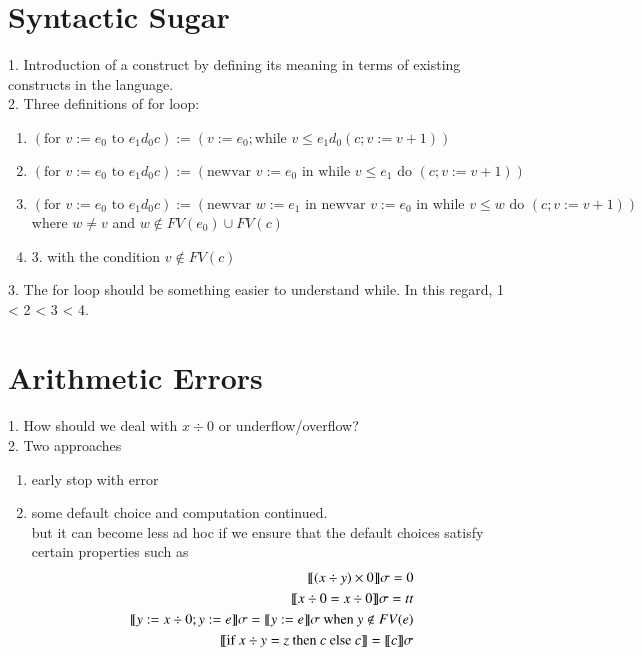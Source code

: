\documentclass{report}[12pt]
\begin{document}
\section{Syntactic Sugar}
1. Introduction of a construct by defining its meaning in terms of existing constructs in the language. \\
2. Three definitions of for loop:
\begin{enumerate}
    \item $(\text{for }v:=e_0 \text{ to }e_1 d_0 c):=(v:=e_0;\text{while }v\le e_1 d_0 (c;v:=v+1))$
    \item $(\text{for }v:=e_0 \text{ to }e_1 d_0 c):=(\text{newvar }v:=e_0\text{ in while }v\le e_1 \text{ do }(c;v:=v+1))$
    \item $(\text{for }v:=e_0 \text{ to }e_1 d_0 c):=(\text{newvar }w:=e_1 \text{ in newvar }v:=e_0 \text{ in while }v\le w\text{ do }(c;v:=v+1))$\\
    where $w\neq v$ and $w \notin FV(e_0)\cup FV(c)$
    \item 3. with the condition $v\notin FV(c)$
\end{enumerate}
3. The for loop should be something easier to understand while. In this regard, 1 < 2 < 3 < 4.
\section{Arithmetic Errors}
1. How should we deal with $x\div 0$ or underflow/overflow? \\
2. Two approaches
\begin{enumerate}
    \item early stop with error
    \item some default choice and computation continued. \\
    but it can become less ad hoc if we ensure that the default choices satisfy certain properties such as
    \begin{align*}
        \llbracket (x\div y)\times 0 \rrbracket\sigma = 0 \\
        \llbracket x\div 0 = x \div 0 \rrbracket\sigma = tt \\
        \llbracket y:=x\div 0;y:=e \rrbracket \sigma = \llbracket y:=e \rrbracket\sigma \text{ when }y \notin FV(e) \\
        \llbracket \text{if }x\div y=z\text{ then }c \text{ else }c \rrbracket=\llbracket c \rrbracket\sigma
    \end{align*}
\end{enumerate}
\end{document}
